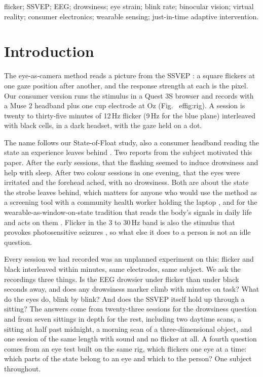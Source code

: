 \documentclass[conference]{IEEEtran}
\begin{document}
\begin{IEEEkeywords}
flicker; SSVEP; EEG; drowsiness; eye strain; blink rate; binocular vision; virtual reality; consumer electronics; wearable sensing; just-in-time adaptive intervention.
\end{IEEEkeywords}

\section{Introduction}

The eye-as-camera method \cite{mann2019eye} reads a picture from the SSVEP \cite{norcia2015ssvep}: a square flickers at one gaze position after another, and the response strength at each is the pixel. Our consumer version runs the stimulus in a Quest 3S browser and records with a Muse 2 headband plus one cup electrode at Oz (Fig.~
ef{fig:rig}). A session is twenty to thirty-five minutes of 12\,Hz flicker (9\,Hz for the blue plane) interleaved with black cells, in a dark headset, with the gaze held on a dot.

The name follows our State-of-Float study, also a consumer headband reading the state an experience leaves behind \cite{mann2026float}. Two reports from the subject motivated this paper. After the early sessions, that the flashing seemed to induce drowsiness and help with sleep. After two colour sessions in one evening, that the eyes were irritated and the forehead ached, with no drowsiness. Both are about the state the strobe leaves behind, which matters for anyone who would use the method as a screening tool with a community health worker holding the laptop \cite{fletcher2010wearable, fletcher2014mental}, and for the wearable-as-window-on-state tradition that reads the body's signals in daily life and acts on them \cite{picard1997wearables, fletcher2010icalm, hernandez2013insideout, nahum2018jitai}. Flicker in the 3 to 30\,Hz band is also the stimulus that provokes photosensitive seizures \cite{fisher2005photic}, so what else it does to a person is not an idle question.

Every session we had recorded was an unplanned experiment on this: flicker and black interleaved within minutes, same electrodes, same subject. We ask the recordings three things. Is the EEG drowsier under flicker than under black seconds away, and does any drowsiness marker climb with minutes on task? What do the eyes do, blink by blink? And does the SSVEP itself hold up through a sitting? The answers come from twenty-three sessions for the drowsiness question and from seven sittings in depth for the rest, including two daytime scans, a sitting at half past midnight, a morning scan of a three-dimensional object, and one session of the same length with sound and no flicker at all. A fourth question comes from an eye test built on the same rig, which flickers one eye at a time: which parts of the state belong to an eye and which to the person? One subject throughout.
\end{document}
